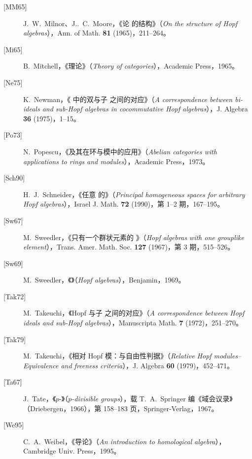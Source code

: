 \begin{description}
\item[{[MM65]}] J.~W.~Milnor、J..~C.~Moore，《论 的结构》（\textit{On the structure of Hopf algebras}），Ann. of Math. \textbf{81} (1965)，211--264。
\item[{[Mi65]}] B.~Mitchell，《理论》（\textit{Theory of categories}），Academic Press，1965。
\item[{[Ne75]}] K.~Newman，《 中的双与子 之间的对应》（\textit{A correspondence between bi-ideals and sub-Hopf algebras in cocommutative Hopf algebras}），J. Algebra \textbf{36} (1975)，1--15。
\item[{[Po73]}] N.~Popescu，《及其在环与模中的应用》（\textit{Abelian categories with applications to rings and modules}），Academic Press，1973。
\item[{[Sch90]}] H.~J.~Schneider，《任意 的》（\textit{Principal homogeneous spaces for arbitrary Hopf algebras}），Israel J. Math. \textbf{72} (1990)，第 1--2 期，167--195。
\item[{[Sw67]}] M.~Sweedler，《只有一个群状元素的 》（\textit{Hopf algebras with one grouplike element}），Trans. Amer. Math. Soc. \textbf{127} (1967)，第 3 期，515--526。
\item[{[Sw69]}] M.~Sweedler，《》（\textit{Hopf algebras}），Benjamin，1969。
\item[{[Tak72]}] M.~Takeuchi，《Hopf 与子 之间的对应》（\textit{A correspondence between Hopf ideals and sub-Hopf algebras}），Manuscripta Math. \textbf{7} (1972)，251--270。
\item[{[Tak79]}] M.~Takeuchi，《相对 Hopf 模：与自由性判据》（\textit{Relative Hopf modules--Equivalence and freeness criteria}），J. Algebra \textbf{60} (1979)，452--471。
\item[{[Ta67]}] J.~Tate，《$p$-》（\textit{$p$-divisible groups}），载 T.~A.~Springer 编《域会议录》（Driebergen，1966），第 158--183 页，Springer-Verlag，1967。
\item[{[We95]}] C.~A.~Weibel，《导论》（\textit{An introduction to homological algebra}），Cambridge Univ. Press，1995。
\end{description}
